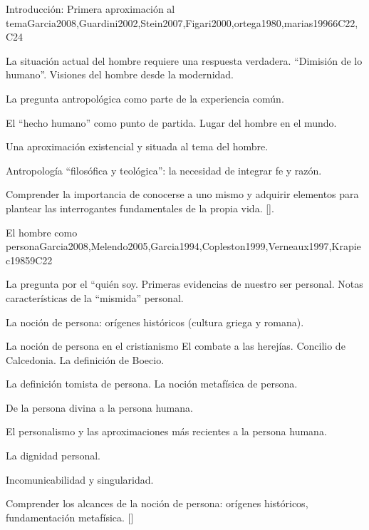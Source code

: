 \begin{syllabus}
\begin{unit}{}{Introducción: Primera aproximación al tema}{Garcia2008,Guardini2002,Stein2007,Figari2000,ortega1980,marias1996}{6}{C22,C24}
\begin{topics}
	\item La situación actual del hombre requiere una respuesta verdadera. ``Dimisión de lo humano''. Visiones del hombre desde la modernidad.
	\item La pregunta antropológica como parte de la experiencia común.
	\item El ``hecho humano'' como punto de partida. Lugar del hombre en el mundo.
	\item Una aproximación existencial y situada al tema del hombre.
	\item Antropología ``filosófica y teológica'': la necesidad de integrar fe y razón.
\end{topics}

\begin{learningoutcomes}
	\item Comprender la importancia de conocerse a uno mismo y adquirir elementos para plantear las interrogantes fundamentales de la propia vida. [\Usage].
\end{learningoutcomes}
\end{unit}

\begin{unit}{}{El hombre como persona}{Garcia2008,Melendo2005,Garcia1994,Copleston1999,Verneaux1997,Krapiec1985}{9}{C22}
\begin{topics}
	\item La pregunta por el ``quién soy.
		\subitem Primeras evidencias de nuestro ser personal.
		\subitem Notas características de la ``mismida'' personal.
	\item La noción de persona: orígenes históricos (cultura griega y romana).
	\item La noción de persona en el cristianismo
		\subitem El combate a las herejías.
		\subitem Concilio de Calcedonia. 
		\subitem La definición de Boecio.
	\item La definición tomista de persona.
		\subitem La noción metafísica de persona.
	\item De la persona divina a la persona humana.
	\item El personalismo y las aproximaciones más recientes a la persona humana.
	\item La dignidad personal.
	\item Incomunicabilidad y singularidad.
\end{topics}
\begin{learningoutcomes}
	\item Comprender los alcances de la noción de persona: orígenes históricos, fundamentación metafísica. [\Usage]
\end{learningoutcomes}
\end{unit}


\end{syllabus}
